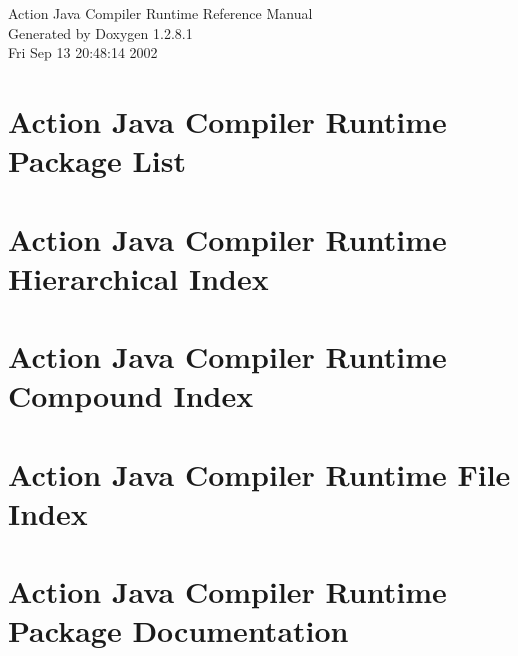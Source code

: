 \documentclass[a4paper]{book}
\begin{document}
\begin{titlepage}
\vspace*{7cm}
\begin{center}
{\Large Action Java Compiler Runtime Reference Manual}\\
\vspace*{1cm}
{\large Generated by Doxygen 1.2.8.1}\\
\vspace*{0.5cm}
{\small Fri Sep 13 20:48:14 2002}\\
\end{center}
\end{titlepage}
\clearemptydoublepage
{}
\tableofcontents
\clearemptydoublepage
{}
\chapter{Action Java Compiler Runtime Package List}

\chapter{Action Java Compiler Runtime Hierarchical Index}

\chapter{Action Java Compiler Runtime Compound Index}

\chapter{Action Java Compiler Runtime File Index}

\chapter{Action Java Compiler Runtime Package Documentation}



\end{document}
